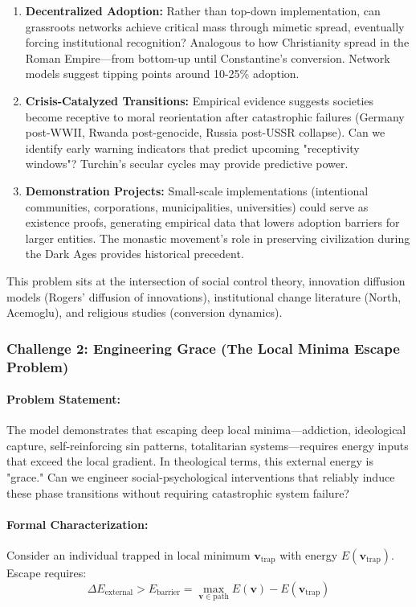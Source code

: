 \documentclass[11pt,a4paper]{article}
\theoremstyle{definition}
\theoremstyle{remark}
\begin{document}
\begin{small}
\begin{enumerate}
    \item \textbf{Decentralized Adoption:} Rather than top-down implementation, can grassroots networks achieve critical mass through mimetic spread, eventually forcing institutional recognition? Analogous to how Christianity spread in the Roman Empire—from bottom-up until Constantine's conversion. Network models suggest tipping points around 10-25\% adoption.
    
    \item \textbf{Crisis-Catalyzed Transitions:} Empirical evidence suggests societies become receptive to moral reorientation after catastrophic failures (Germany post-WWII, Rwanda post-genocide, Russia post-USSR collapse). Can we identify early warning indicators that predict upcoming "receptivity windows"? Turchin's secular cycles may provide predictive power.
    
    \item \textbf{Demonstration Projects:} Small-scale implementations (intentional communities, corporations, municipalities, universities) could serve as existence proofs, generating empirical data that lowers adoption barriers for larger entities. The monastic movement's role in preserving civilization during the Dark Ages provides historical precedent.
\end{enumerate}

This problem sits at the intersection of social control theory, innovation diffusion models (Rogers' diffusion of innovations), institutional change literature (North, Acemoglu), and religious studies (conversion dynamics).

\subsubsection{Challenge 2: Engineering Grace (The Local Minima Escape Problem)}

\paragraph{Problem Statement:} 
The model demonstrates that escaping deep local minima—addiction, ideological capture, self-reinforcing sin patterns, totalitarian systems—requires energy inputs that exceed the local gradient. In theological terms, this external energy is "grace." Can we engineer social-psychological interventions that reliably induce these phase transitions without requiring catastrophic system failure?

\paragraph{Formal Characterization:}
Consider an individual trapped in local minimum \(\mathbf{v}_{\text{trap}}\) with energy \(E(\mathbf{v}_{\text{trap}})\). Escape requires:
\begin{equation}
\Delta E_{\text{external}} > E_{\text{barrier}} = \max_{\mathbf{v} \in \text{path}} E(\mathbf{v}) - E(\mathbf{v}_{\text{trap}})
\end{equation}


\end{small}
\end{document}
